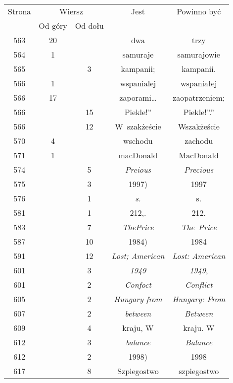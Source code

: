 \documentclass[a4paper,11pt]{article}
\begin{document}
\begin{center}
  \newpage

  \begin{tabular}{|c|c|c|c|c|}
    \hline
    Strona & \multicolumn{2}{c|}{Wiersz} & Jest
                              & Powinno być \\ \cline{2-3}
    & Od góry & Od dołu & & \\
    \hline
    563 & 20 & & dwa & trzy \\
    564 & \hphantom{0}1 & & samuraje & samurajowie \\
    565 & & \hphantom{0}3 & kampanii; & kampanii. \\
    566 & \hphantom{0}1 & & wspanialej & wspaniałej \\
    566 & 17 & & zaporami\ldots & zaopatrzeniem; \\
    566 & & 15 & Piekle!” & Piekle!”.” \\
    566 & & 12 & W~szakżeście& Wszakżeście \\
    570 & \hphantom{0}4 & & wschodu & zachodu \\
    571 & \hphantom{0}1 & & macDonald & MacDonald \\
    574 & & \hphantom{0}5 & \textit{Preious} & \textit{Precious} \\
    575 & & \hphantom{0}3 & 1997) & 1997 \\
    576 & & \hphantom{0}1 & \textit{s.} & s. \\
    581 & & \hphantom{0}1 & 212,. & 212. \\
    583 & & \hphantom{0}7 & \textit{ThePrice} & \textit{The~Price} \\
    587 & & 10 & 1984) & 1984 \\
    591 & & 12 & \textit{Lost; American} & \textit{Lost: American} \\
    601 & & \hphantom{0}3 & \textit{1949} & \textit{1949}, \\
    601 & & \hphantom{0}2 & \textit{Confoct} & \textit{Conflict} \\
    605 & & \hphantom{0}2 & \textit{Hungary from}
    & \textit{Hungary: From} \\
    607 & & \hphantom{0}2 & \textit{between} & \textit{Between} \\
    609 & & \hphantom{0}4 & kraju, W & kraju. W \\
    612 & & \hphantom{0}3 & \textit{balance} & \textit{Balance} \\
    612 & & \hphantom{0}2 & 1998) & 1998 \\
    617 & & \hphantom{0}8 & Szpiegostwo & szpiegostwo \\

\end{tabular}
\end{center}
\end{document}
